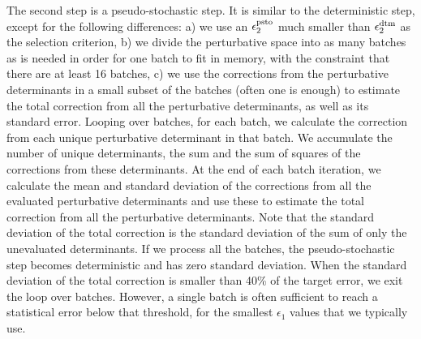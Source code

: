 \documentclass[%
reprint,
 superscriptaddress,
 amsmath,amssymb,
 aps,
]{revtex4-1}
\begin{document}
The second step is a pseudo-stochastic step.
It is similar to the deterministic step, except for the following differences: 
a) we use an $\epsilon_2^{\rm psto}$ much smaller than $\epsilon_2^{\rm dtm}$ as the selection criterion,
b) we divide the perturbative space into as many batches as is needed in order for one batch to fit in memory,
with the constraint that there are at least 16 batches,
c) we use the corrections from the perturbative determinants in a small subset of the batches (often one is enough)
to estimate the total correction from all the perturbative determinants, as well as its standard error.
Looping over batches, for each batch, we calculate the correction from each unique perturbative determinant in that batch.
We accumulate the number of unique determinants, the sum and the sum of squares of the corrections from these determinants.
At the end of each batch iteration, we calculate the mean and standard deviation of the corrections from all the
evaluated perturbative determinants and use these to estimate the total correction from all the perturbative determinants.
Note that the standard deviation of the total correction is the standard deviation of the sum of only the unevaluated determinants.
If we process all the batches, the pseudo-stochastic step becomes deterministic and has zero standard deviation.
When the standard deviation of the total correction is smaller than 40\% of the target error, we exit the loop over batches.
However, a single batch is often sufficient to reach a statistical error below that threshold,
for the smallest $\epsilon_1$ values that we typically use.
\end{document}

